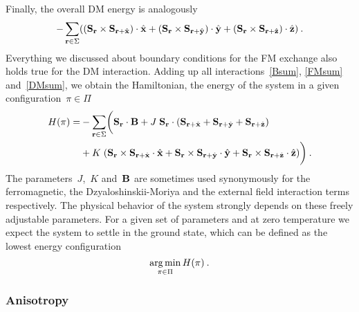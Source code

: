 Finally, the overall DM energy is analogously
%
\begin{equation}\label{DMsum}
  -\sum_{\mathbf{r} \in \Sigma} ((\mathbf{S}_{\mathbf{r}} \times \mathbf{S}_{\mathbf{r} + \hat{\mathbf{x}}}) \cdot \hat{\mathbf{x}} +
    (\mathbf{S}_{\mathbf{r}} \times \mathbf{S}_{\mathbf{r} + \hat{\mathbf{y}}}) \cdot \hat{\mathbf{y}} +
    (\mathbf{S}_{\mathbf{r}} \times \mathbf{S}_{\mathbf{r} + \hat{\mathbf{z}}}) \cdot \hat{\mathbf{z}})\:.
\end{equation}
%
Everything we discussed about boundary conditions for the FM exchange also holds
true for the DM interaction. Adding up all
interactions~\eqref{Bsum}, \eqref{FMsum} and~\eqref{DMsum}, we obtain the
Hamiltonian, \ie{} the energy of the system in a given configuration~$\pi \in
\Pi$
%
\begin{align}\label{hamiltonian}
  H(\pi) = &-\sum_{\mathbf{r} \in \Sigma}\biggl(\mathbf{S}_{\mathbf{r}} \cdot \mathbf{B} +
      J\; \mathbf{S}_{\mathbf{r}} \cdot (\mathbf{S}_{\mathbf{r}+\hat{\mathbf{x}}} + \mathbf{S}_{\mathbf{r}+\hat{\mathbf{y}}} + \mathbf{S}_{\mathbf{r}+\hat{\mathbf{z}}})\nonumber \\
      &+ K\; (\mathbf{S}_{\mathbf{r}} \times \mathbf{S}_{\mathbf{r}+\hat{\mathbf{x}}} \cdot \hat{\mathbf{x}} +
            \mathbf{S}_{\mathbf{r}} \times \mathbf{S}_{\mathbf{r}+\hat{\mathbf{y}}} \cdot \hat{\mathbf{y}} +
            \mathbf{S}_{\mathbf{r}} \times \mathbf{S}_{\mathbf{r}+\hat{\mathbf{z}}} \cdot \hat{\mathbf{z}})\biggr)\:.
\end{align}
%
The parameters~$J$,~$K$ and~$\mathbf{B}$ are sometimes used synonymously for the
ferromagnetic, the Dzyaloshinskii-Moriya and the external field interaction
terms respectively. The physical behavior of the system strongly depends on
these freely adjustable parameters. For a given set of parameters and at zero
temperature we expect the system to settle in the ground state, which can be
defined as the lowest energy configuration
%
\begin{equation}\label{objective}
  \operatorname*{arg\,min}_{\pi \in \Pi} H(\pi)\:.
\end{equation}
%

\subsubsection{Anisotropy}

